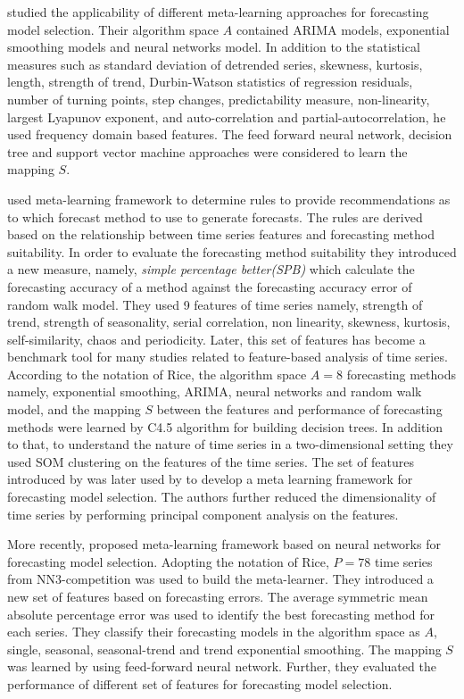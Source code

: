 \documentclass[11pt,a4paper,]{article}
\theoremstyle{definition}
\theoremstyle{definition}
\theoremstyle{definition}
\theoremstyle{remark}
\begin{document}
\textcite{lemke2010meta} studied the applicability of different
meta-learning approaches for forecasting model selection. Their
algorithm space \(A\) contained ARIMA models, exponential smoothing
models and neural networks model. In addition to the statistical
measures such as standard deviation of detrended series, skewness,
kurtosis, length, strength of trend, Durbin-Watson statistics of
regression residuals, number of turning points, step changes,
predictability measure, non-linearity, largest Lyapunov exponent, and
auto-correlation and partial-autocorrelation, he used frequency domain
based features. The feed forward neural network, decision tree and
support vector machine approaches were considered to learn the mapping
\(S\).

\textcite{wang2009rule} used meta-learning framework to determine rules
to provide recommendations as to which forecast method to use to
generate forecasts. The rules are derived based on the relationship
between time series features and forecasting method suitability. In
order to evaluate the forecasting method suitability they introduced a
new measure, namely, \emph{simple percentage better(SPB)} which
calculate the forecasting accuracy of a method against the forecasting
accuracy error of random walk model. They used 9 features of time series
namely, strength of trend, strength of seasonality, serial correlation,
non linearity, skewness, kurtosis, self-similarity, chaos and
periodicity. Later, this set of features has become a benchmark tool for
many studies related to feature-based analysis of time series. According
to the notation of Rice, the algorithm space \(A=8\) forecasting methods
namely, exponential smoothing, ARIMA, neural networks and random walk
model, and the mapping \(S\) between the features and performance of
forecasting methods were learned by C4.5 algorithm for building decision
trees. In addition to that, to understand the nature of time series in a
two-dimensional setting they used SOM clustering on the features of the
time series. The set of features introduced by \textcite{wang2009rule}
was later used by \textcite{widodomodel} to develop a meta learning
framework for forecasting model selection. The authors further reduced
the dimensionality of time series by performing principal component
analysis on the features.

More recently, \textcite{kuck2016meta} proposed meta-learning framework
based on neural networks for forecasting model selection. Adopting the
notation of Rice, \(P = 78\) time series from NN3-competition was used
to build the meta-learner. They introduced a new set of features based
on forecasting errors. The average symmetric mean absolute percentage
error was used to identify the best forecasting method for each series.
They classify their forecasting models in the algorithm space as \(A\),
single, seasonal, seasonal-trend and trend exponential smoothing. The
mapping \(S\) was learned by using feed-forward neural network. Further,
they evaluated the performance of different set of features for
forecasting model selection.
\end{document}
